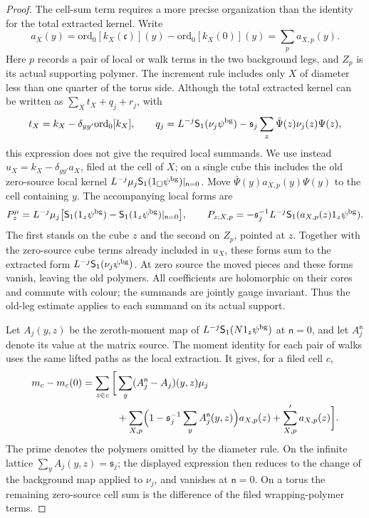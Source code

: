 \documentclass[11pt,letterpaper,reqno]{amsart}
\theoremstyle{definition}
\theoremstyle{remark}
\begin{document}
\begin{proof}
The cell-sum term requires a more precise organization than the
identity for the total extracted kernel. Write
\[
 a_X(y)=\mathrm{ord}_0[k_X(\mathfrak c)](y)
              -\mathrm{ord}_0[k_X(0)](y)
       =\sum_p a_{X,p}(y).
\]
Here $p$ records a pair of local or walk terms in the two background
legs, and $Z_p$ is its actual supporting polymer. The increment
rule includes only $X$ of diameter less than one quarter of the
torus side. Although the total extracted kernel can be written as
$\sum_Xt_X+q_j+r_j$, with
\[
 t_X=k_X-\delta_{yy'}\mathrm{ord}_0[k_X],\qquad
 q_j=L^{-j}\mathsf S_1(\nu_j\psi^{\rm bg})
           -\mathfrak s_j\sum_z\bar\Psi(z)\nu_j(z)\Psi(z),
\]
this expression does not give the required local summands. We use
instead $u_X=k_X-\delta_{yy'}a_X$, filed at the cell of $X$;
on a single cube this includes the old zero-source local kernel
$L^{-j}\mu_j\mathsf S_1(1_\square\psi^{\rm bg})|_{\mathsf n=0}$.
Move $\bar\Psi(y)a_{X,p}(y)\Psi(y)$ to the cell containing $y$.
The accompanying local forms are
\[
 P_z^\mu=L^{-j}\mu_j
   \bigl[\mathsf S_1(1_z\psi^{\rm bg})
               -\mathsf S_1(1_z\psi^{\rm bg})|_{\mathsf n=0}\bigr],
 \qquad
 P_{z;X,p}=-\mathfrak s_j^{-1}L^{-j}
                 \mathsf S_1(a_{X,p}(z)1_z\psi^{\rm bg}).
\]
The first stands on the cube $z$ and the second on $Z_p$, pointed
at $z$. Together with the zero-source cube terms already included
in $u_X$, these forms sum to the extracted form
$L^{-j}\mathsf S_1(\nu_j\psi^{\rm bg})$. At zero source the moved
pieces and these forms vanish, leaving the old polymers. All
coefficients are holomorphic on their cores and commute with
colour; the summands are jointly gauge invariant. Thus the
old-leg estimate applies to each summand on its actual support.

Let $A_j(y,z)$ be the zeroth-moment map of
$L^{-j}\mathsf S_1(N1_z\psi^{\rm bg})$ at $\mathsf n=0$, and
let $A_j^{\mathsf n}$ denote its value at the matrix source.
The moment identity for each pair of walks uses the same lifted
paths as the local extraction. It gives, for a filed cell $c$,
\[
\begin{split}
 m_c-m_c(0)=\sum_{z\in c}\bigg[&
  \sum_y(A_j^{\mathsf n}-A_j)(y,z)\mu_j\\
 &+\sum_{X,p}\Bigl(1-\mathfrak s_j^{-1}
                 \sum_yA_j^{\mathsf n}(y,z)\Bigr)a_{X,p}(z)
   +\sum_{X,p}'a_{X,p}(z)\bigg].
\end{split}
\]
The prime denotes the polymers omitted by the diameter rule.
On the infinite lattice $\sum_yA_j(y,z)=\mathfrak s_j$;
the displayed expression then reduces to the change of the
background map applied to $\nu_j$, and vanishes at
$\mathsf n=0$. On a torus the remaining zero-source cell sum
is the difference of the filed wrapping-polymer terms.


\end{proof}
\end{document}
